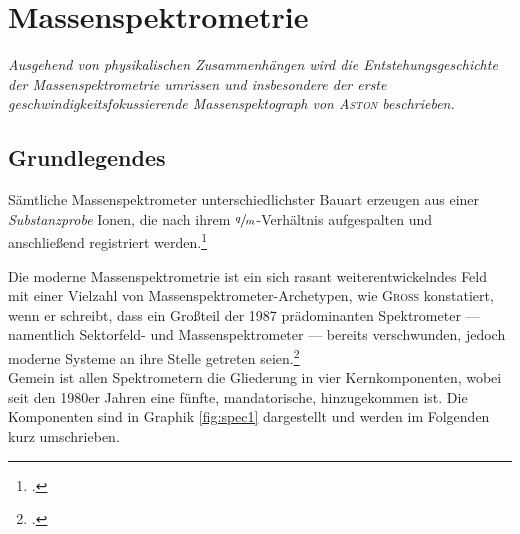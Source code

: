 \chapter{Massenspektrometrie}
\label{kap:2}

\textit{Ausgehend von physikalischen Zusammenhängen wird die Entstehungsgeschichte der Massenspektrometrie umrissen und insbesondere der erste geschwindigkeitsfokussierende Massenspektograph von \textsc{Aston} beschrieben.}

\section{Grundlegendes}
Sämtliche Massenspektrometer unterschiedlichster Bauart erzeugen aus einer \textit{Substanzprobe} Ionen, die nach ihrem $\sfrac{q}{m}$-Verhältnis aufgespalten und anschließend registriert werden.\footcite[vgl.][S.\,7]{Budz2005}\par
Die moderne Massenspektrometrie ist ein sich rasant weiterentwickelndes Feld mit einer Vielzahl von Massenspektrometer-Archetypen, wie \textsc{Gross} konstatiert, wenn er schreibt, dass ein Großteil der 1987 prädominanten Spektrometer --- namentlich Sektorfeld- und Massenspektrometer --- bereits verschwunden, jedoch moderne Systeme an ihre Stelle getreten seien.\footcite[vgl.][S.\,131]{Gross2012}\\

Gemein ist allen Spektrometern die Gliederung in vier Kernkomponenten, wobei seit den 1980er Jahren eine fünfte, mandatorische, hinzugekommen ist. Die Komponenten sind in Graphik \ref{fig:spec1} dargestellt und werden im Folgenden kurz umschrieben.
